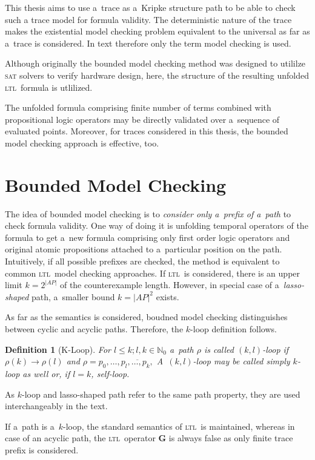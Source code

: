 \documentclass[12pt,twoside,draft]{fithesis}
\newcommand{\ltl}{\textsc{ltl}~}
\newcommand{\mNatural}{\mathbb{N}}
\newcommand{\bG}{\mathbf{G}}
\newtheorem{mydef}{Definition}
\begin{document}
This thesis aims to use a~trace as a~Kripke structure path to be able
to check such a trace model for formula validity. The deterministic
nature of the trace makes the existential model checking problem
equivalent to the universal as far as a~trace is considered.
In text therefore only the term model checking is used.

Although originally\cite{biere} the bounded model checking method was
designed to utililze \textsc{sat} solvers to verify hardware design,
here, the structure of the resulting unfolded \ltl formula is utlilized.

The unfolded formula comprising finite number of terms combined with
propositional logic operators may be directly validated over a~sequence
of evaluated points. Moreover, for traces considered in this thesis,
the bounded model checking approach is effective, too.

\section{Bounded Model Checking}
The idea of bounded model checking is to \emph{consider only a~prefix
of a~path} to check formula validity. One way of doing it is unfolding
temporal operators of the formula to get a~new formula comprising only
first order logic operators and original atomic propositions attached
to a~particular position on the path. Intuitively, if all possible
prefixes are checked, the method is equivalent to common \ltl model
checking approaches. If \ltl is considered, there is an upper
limit $k=2^{|AP|}$ of the counterexample length\cite{biere}. However, in
special case of a~\emph{lasso-shaped} path, a~smaller bound $k={|AP|}^2$
exists\cite{biere}.

As far as the semantics is considered, boudned model checking
distinguishes between cyclic and acyclic paths. Therefore, the $k$-loop
definition follows.
\begin{mydef}[K-Loop]
For $l\leq k;l,k\in\mNatural_0$ a~path $\rho$ is called $(k,l)$-loop
if $\rho(k)\rightarrow\rho(l)$ and
$\rho=p_0,\dotsc,\overline{p_{l},\dotsc,p_{k},}$
A~$(k,l)$-loop may be called simply $k$-loop as well or, if $l=k$,
self-loop.
\end{mydef}
As $k$-loop and lasso-shaped path refer to the same path property, they
are used interchangeably in the text.

If a~path is a~$k$-loop, the standard semantics of \ltl is maintained,
whereas in case of an acyclic path, the \ltl operator $\bG$ is always
false as only finite trace prefix is considered.
\end{document}

